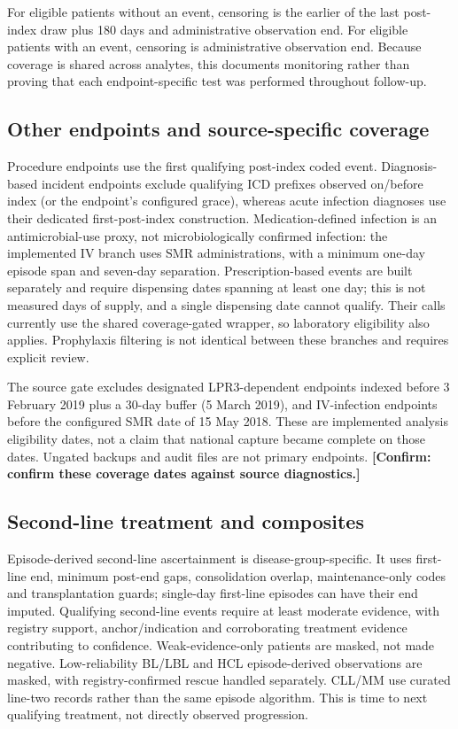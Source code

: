 \documentclass[10pt]{article}
\newcommand{\pending}[1]{\textbf{[Confirm: #1]}}
\begin{document}
For eligible patients without an event, censoring is the earlier of the last
post-index draw plus 180 days and administrative observation end. For eligible
patients with an event, censoring is administrative observation end. Because
coverage is shared across analytes, this documents monitoring rather than
proving that each endpoint-specific test was performed throughout follow-up.

\subsection*{Other endpoints and source-specific coverage}
Procedure endpoints use the first qualifying post-index coded event.
Diagnosis-based incident endpoints exclude qualifying ICD prefixes observed
on/before index (or the endpoint's configured grace), whereas acute infection
diagnoses use their dedicated first-post-index construction. Medication-defined
infection is an antimicrobial-use proxy, not microbiologically confirmed
infection: the implemented IV branch uses SMR administrations, with a minimum
one-day episode span and seven-day separation. Prescription-based events
are built separately and require dispensing dates spanning at least one day;
this is not measured days of supply, and a single dispensing date cannot qualify.
Their calls currently use the shared coverage-gated
wrapper, so laboratory eligibility also applies. Prophylaxis filtering is not
identical between these branches and requires explicit review.

The source gate excludes designated LPR3-dependent endpoints indexed before
3 February 2019 plus a 30-day buffer (5 March 2019), and IV-infection endpoints
before the configured SMR date of 15 May 2018. These are implemented analysis
eligibility dates, not a claim that national capture became complete on those
dates. Ungated backups and audit files are not primary endpoints.
\pending{confirm these coverage dates against source diagnostics.}

\subsection*{Second-line treatment and composites}
Episode-derived second-line ascertainment is disease-group-specific. It uses
first-line end, minimum post-end gaps, consolidation overlap, maintenance-only
codes and transplantation guards; single-day first-line episodes can have
their end imputed. Qualifying second-line events require at least moderate
evidence, with registry support, anchor/indication and corroborating treatment
evidence contributing to confidence. Weak-evidence-only patients are masked,
not made negative. Low-reliability BL/LBL and HCL episode-derived observations
are masked, with registry-confirmed rescue handled separately. CLL/MM use
curated line-two records rather than the same episode algorithm.
This is time to next qualifying treatment, not directly observed progression.
\end{document}
